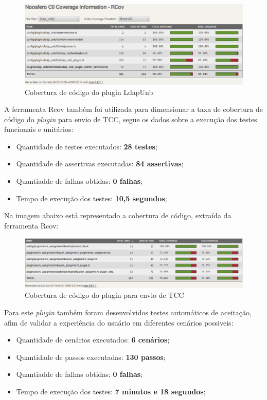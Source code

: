 %
\begin{figure}[!h]
    \centering
    \includegraphics[keepaspectratio=false,scale=0.45]
      {figuras/cobertura_teste.eps}
    \caption{Cobertura de código do plugin LdapUnb}
    \label{consideracoes_cobertura1}
\end{figure}
%


A ferramenta Rcov também foi utilizada para dimensionar a taxa de cobertura de código do \textit{plugin} para envio de TCC, segue os dados sobre a execução dos testes funcionais e unitários:
\begin{itemize}
\item Quantidade de testes executados: \textbf{28 testes};
\item Quantidade de assertivas executadas: \textbf{84 assertivas};
\item Quantiadde de falhas obtidas: \textbf{0 falhas};
\item Tempo de execução dos testes: \textbf{10,5 segundos};
\end{itemize}

Na imagem abaixo está representado a cobertura de código, extraída da ferramenta Rcov:

\begin{figure}[!h]
    \centering
    \includegraphics[keepaspectratio=false,scale=0.45]
      {figuras/cobertura_tcc.eps}
    \caption{Cobertura de código do plugin para envio de TCC}
    \label{consideracoes_cobertura2}
\end{figure}

Para este \textit{plugin} também foram desenvolvidos testes automáticos de aceitação, afim de validar a experiência do usuário em diferentes cenários possiveis:
\begin{itemize}
\item Quantidade de cenários executados: \textbf{6 cenários};
\item Quantidade de passos executadas: \textbf{130 passos};
\item Quantiadde de falhas obtidas: \textbf{0 falhas};
\item Tempo de execução dos testes: \textbf{7 minutos e 18 segundos};
\end{itemize}

